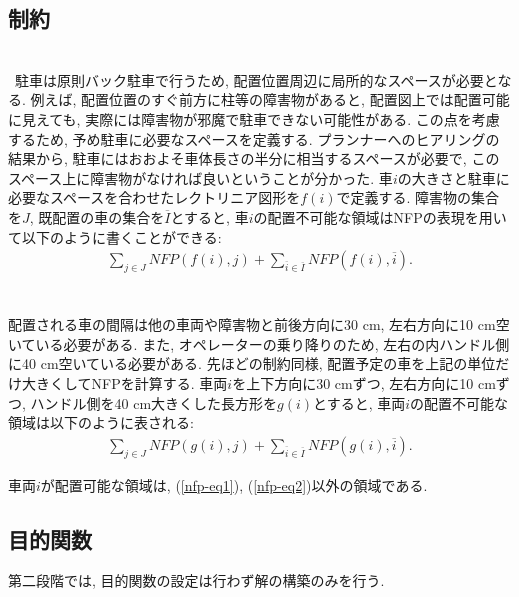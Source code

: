 \subsection{制約}
\\
\ 駐車は原則バック駐車で行うため, 配置位置周辺に局所的なスペースが必要となる. 
例えば, 配置位置のすぐ前方に柱等の障害物があると, 配置図上では配置可能に見えても, 実際には障害物が邪魔で駐車できない可能性がある.
この点を考慮するため, 予め駐車に必要なスペースを定義する.
プランナーへのヒアリングの結果から, 駐車にはおおよそ車体長さの半分に相当するスペースが必要で, このスペース上に障害物がなければ良いということが分かった. 
車$i$の大きさと駐車に必要なスペースを合わせたレクトリニア図形を$f(i)$で定義する. 
障害物の集合を$J$, 既配置の車の集合を$\overline{I}$とすると, 車$i$の配置不可能な領域はNFPの表現を用いて以下のように書くことができる:  
\begin{eqnarray}
    \label{nfp-eq1}
    \sum_{j \in J} NFP(f(i),j) + \sum_{\overline{i} \in \overline{I}} NFP(f(i),\overline{i}). 
\end{eqnarray}\\

\\
配置される車の間隔は他の車両や障害物と前後方向に30 cm, 左右方向に10 cm空いている必要がある. 
また, オペレーターの乗り降りのため, 左右の内ハンドル側に40 cm空いている必要がある. 
先ほどの制約同様, 配置予定の車を上記の単位だけ大きくしてNFPを計算する. 
車両$i$を上下方向に30 cmずつ, 左右方向に10 cmずつ, ハンドル側を40 cm大きくした長方形を$g(i)$とすると, 車両$i$の配置不可能な領域は以下のように表される: 
\begin{eqnarray}
    \label{nfp-eq2}
    \sum_{j \in J} NFP(g(i),j) + \sum_{\overline{i} \in \overline{I}} NFP(g(i),\overline{i}). 
\end{eqnarray}

車両$i$が配置可能な領域は, (\ref{nfp-eq1}), (\ref{nfp-eq2})以外の領域である. 

\subsection{目的関数}
第二段階では, 目的関数の設定は行わず解の構築のみを行う. 

